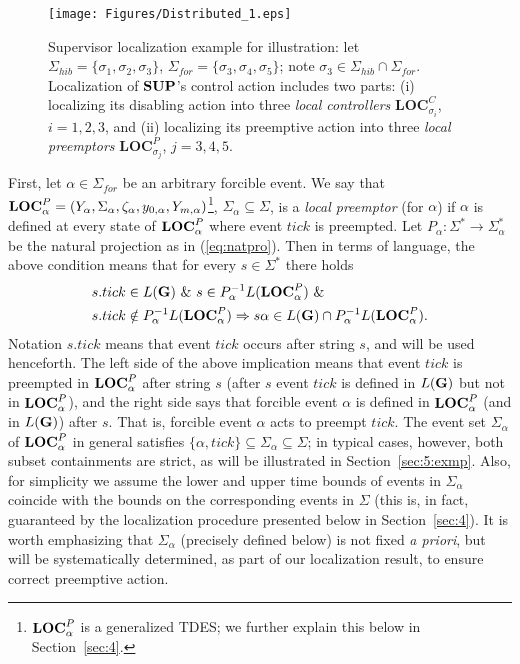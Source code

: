 \documentclass[twocolumn]{autart}
\begin{document}
\begin{figure}\begin{center}
\texttt{[image: Figures/Distributed\_1.eps]}
\caption{Supervisor localization example for illustration: let
$\Sigma_{hib} = \{\sigma_1,\sigma_2,\sigma_3\}$, $\Sigma_{for} =
\{\sigma_3,\sigma_4,\sigma_5\}$; note $\sigma_3 \in \Sigma_{hib}
\cap \Sigma_{for}$.  Localization of $\bf SUP$'s control action
includes two parts: (i) localizing its disabling action into three
\emph{local controllers} $\textbf{LOC}^C_{\sigma_i}$, $i = 1,2,3$,
and (ii) localizing its preemptive action into three \emph{local
preemptors} $\textbf{LOC}^P_{\sigma_j}$, $j = 3,4,5$.}
\label{fig:localization}
\end{center}
\end{figure}

First, let $\alpha \in \Sigma_{for}$ be an arbitrary forcible event.
We say that ${\bf LOC}^P_{\alpha} = (Y_\alpha, \Sigma_\alpha,
\zeta_\alpha, y_{0, \alpha}, Y_{m, \alpha})$\footnote{${\bf
LOC}^P_{\alpha}$ is a generalized TDES; we further explain this
below in Section~\ref{sec:4}.}, $\Sigma_\alpha \subseteq \Sigma$, is
a \emph{local preemptor} (for $\alpha$) if $\alpha$ is defined at
every state of ${\bf LOC}^P_{\alpha}$ where event $tick$ is
preempted.  Let $P_{\alpha} : \Sigma^* \rightarrow
\Sigma_{\alpha}^*$ be the natural projection as in
(\ref{eq:natpro}).  Then in terms of language, the above condition
means that for every $s \in \Sigma^*$ there holds
\begin{align*} &s.tick \in L({\bf G}) ~\&~ s \in P^{-1}_{\alpha} L({\bf
LOC}^P_{\alpha})  ~\&~ \\
&s.tick \notin P^{-1}_{\alpha} L({\bf
LOC}^P_{\alpha})  \Rightarrow  s\alpha \in L({\bf G}) \cap
P^{-1}_{\alpha} L({\bf LOC}^P_{\alpha}).
\end{align*}
Notation $s.tick$ means that event $tick$ occurs after string $s$,
and will be used henceforth. The left side of the above implication
means that event $tick$ is preempted in ${\bf LOC}^P_{\alpha}$ after
string $s$ (after $s$ event $tick$ is defined in $L({\bf G})$ but
not in ${\bf LOC}^P_{\alpha}$), and the right side says that
forcible event $\alpha$ is defined in ${\bf LOC}^P_{\alpha}$ (and in
$L({\bf G})$) after $s$.  That is, forcible event $\alpha$ acts to
preempt $tick$. The event set $\Sigma_\alpha$ of ${\bf
LOC}^P_{\alpha}$ in general satisfies $\{\alpha, tick\}\subseteq
\Sigma_\alpha \subseteq \Sigma$; in typical cases, however, both
subset containments are strict, as will be illustrated in
Section~\ref{sec:5:exmp}. Also, for simplicity we assume the lower
and upper time bounds of events in $\Sigma_\alpha$ coincide with the
bounds on the corresponding events in $\Sigma$ (this is, in fact,
guaranteed by the localization procedure presented below in
Section~\ref{sec:4}). It is worth emphasizing that $\Sigma_\alpha$
(precisely defined below) is not fixed {\it a priori}, but will be
systematically determined, as part of our localization result, to
ensure correct preemptive action.
\end{document}

